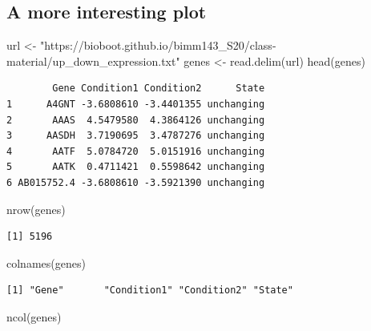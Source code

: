 \documentclass[
  letterpaper,
  DIV=11,
  numbers=noendperiod]{scrartcl}
\newenvironment{Shaded}{\begin{snugshade}}{\end{snugshade}}
\newcommand{\FunctionTok}[1]{\textcolor[rgb]{0.28,0.35,0.67}{#1}}
\newcommand{\NormalTok}[1]{\textcolor[rgb]{0.00,0.23,0.31}{#1}}
\newcommand{\OtherTok}[1]{\textcolor[rgb]{0.00,0.23,0.31}{#1}}
\newcommand{\StringTok}[1]{\textcolor[rgb]{0.13,0.47,0.30}{#1}}
\begin{document}
\hypertarget{a-more-interesting-plot}{%
\subsection{A more interesting plot}\label{a-more-interesting-plot}}

\begin{Shaded}
\begin{Highlighting}[]
\NormalTok{url }\OtherTok{\textless{}{-}} \StringTok{"https://bioboot.github.io/bimm143\_S20/class{-}material/up\_down\_expression.txt"}
\NormalTok{genes }\OtherTok{\textless{}{-}} \FunctionTok{read.delim}\NormalTok{(url)}
\FunctionTok{head}\NormalTok{(genes)}
\end{Highlighting}
\end{Shaded}

\begin{verbatim}
        Gene Condition1 Condition2      State
1      A4GNT -3.6808610 -3.4401355 unchanging
2       AAAS  4.5479580  4.3864126 unchanging
3      AASDH  3.7190695  3.4787276 unchanging
4       AATF  5.0784720  5.0151916 unchanging
5       AATK  0.4711421  0.5598642 unchanging
6 AB015752.4 -3.6808610 -3.5921390 unchanging
\end{verbatim}

\begin{Shaded}
\begin{Highlighting}[]
\FunctionTok{nrow}\NormalTok{(genes)}
\end{Highlighting}
\end{Shaded}

\begin{verbatim}
[1] 5196
\end{verbatim}

\begin{Shaded}
\begin{Highlighting}[]
\FunctionTok{colnames}\NormalTok{(genes)}
\end{Highlighting}
\end{Shaded}

\begin{verbatim}
[1] "Gene"       "Condition1" "Condition2" "State"     
\end{verbatim}

\begin{Shaded}
\begin{Highlighting}[]
\FunctionTok{ncol}\NormalTok{(genes)}
\end{Highlighting}
\end{Shaded}
\end{document}
